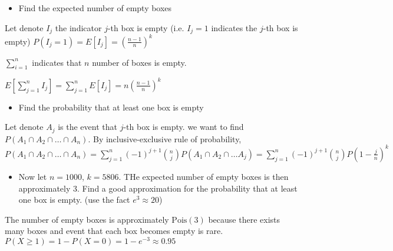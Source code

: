 \documentclass[8pt]{beamer}
\begin{document}
\begin{frame}
    \begin{itemize}
        \item Find the expected number of empty boxes
    \end{itemize}

    Let denote $I_j$ the indicator $j$-th box is empty (i.e. $I_j=1$ indicates the $j$-th box is empty)
    $P(I_j=1) = E[I_j] = (\frac{n-1}{n})^k$

    $\sum_{i=1}^n$ indicates that $n$ number of boxes is empty.

    $E[\sum_{j=1}^n I_j] = \sum_{j=1}^n E[I_j] = n(\frac{n-1}{n})^k$ 

    \begin{itemize}
        \item Find the probability that at least one box is empty
    \end{itemize}

    Let denote $A_j$ is the event that $j$-th box is empty. we want to find $P(A_1 \cap A_2 \cap \dots \cap A_n)$. By inclusive-exclusive rule of probability, $P(A_1 \cap A_2 \cap \dots \cap A_n) = \sum_{j=1}^n (-1)^{j+1} \binom{n}{j} P(A_1 \cap A_2 \cap \dots A_j) = \sum_{j=1}^n (-1)^{j+1} \binom{n}{j} P(1 - \frac{j}{n})^k$

    \begin{itemize}
        \item Now let $n=1000$, $k=5806$. THe expected number of empty boxes is then approximately $3$. Find a good approximation for the probability that at least one box is empty. (use the fact $e^3 \approx 20$)
    \end{itemize}

    The number of empty boxes is approximately $\text{Pois}(3)$ because there exists many boxes and event that each box becomes empty is rare. $P(X \geq 1) =  1 - P(X = 0) = 1 - e^{-3} \approx 0.95$

\end{frame}
\end{document}
